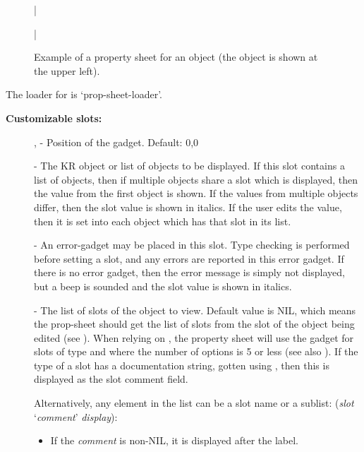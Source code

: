 \begin{figure}
\bar{}
\begin{center}
\end{center}
\caption{Example of a property sheet for an object (the object is
shown at the upper left).}
\bar{}
\end{figure}

The loader for  is `prop-sheet-loader'.

{\bf Customizable slots:}

\begin{description}
\item[] ,  - Position of the gadget.  Default: 0,0

\item[]  - The KR object or list of objects to be displayed.  If this slot
contains a list of objects, then if multiple objects share a slot which is
displayed, then the value from the first object is shown.  If the values from
multiple objects differ, then the slot value is shown in italics.  If
the user edits the value, then it is set into each object which has that slot
in its  list.

\item[]  - An error-gadget may be placed in this slot.
Type checking is performed before setting a slot, and any errors are reported
in this error gadget.  If there is no error gadget, then the error
message is simply not displayed, but a beep is sounded and the slot
value is shown in italics.


 - The list of slots of the object to view.  Default value is NIL,
which means the prop-sheet should get the list of slots from the
 slot of the object being edited (see ).
When relying on , the property sheet will use
the  gadget for slots of type 
and  where the number of options is 5 or less
(see also ).  If the type of a slot has a documentation
string, gotten using
, then this is displayed as the slot
comment field.

Alternatively, any element in the list can be a slot name or a sublist:
({\it slot} `{\it comment}' {\it display}):
\begin{itemize}
\item If the {\it comment} is non-NIL, it is displayed after the label.


\end{itemize}
\end{description}

